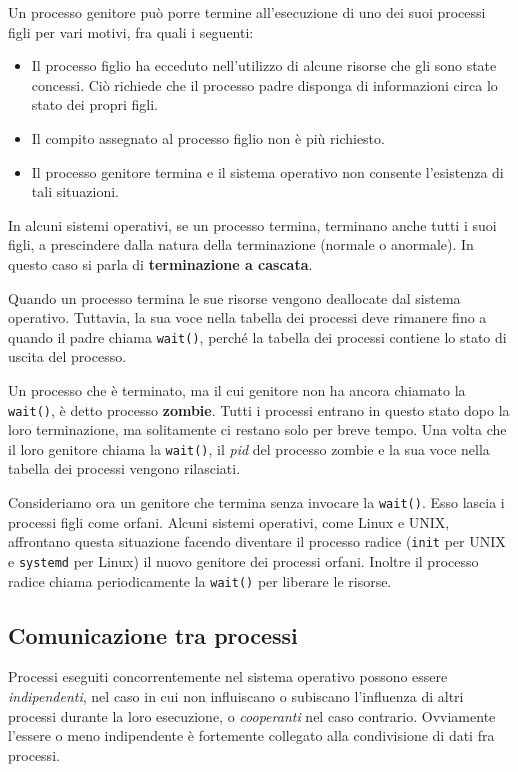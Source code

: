         Un processo genitore può porre termine all'esecuzione di uno dei suoi processi figli per vari motivi, fra quali i seguenti:
        \begin{itemize}
            \item Il processo figlio ha ecceduto nell'utilizzo di alcune risorse che gli sono state concessi. Ciò richiede che il processo padre disponga di informazioni circa lo stato dei propri figli.
            \item Il compito assegnato al processo figlio non è più richiesto.
            \item Il processo genitore termina e il sistema operativo non consente l'esistenza di tali situazioni.
        \end{itemize}
        
        In alcuni sistemi operativi, se un processo termina, terminano anche tutti i suoi figli, a prescindere dalla natura della terminazione (normale o anormale). In questo caso si parla di \textbf{terminazione a cascata}.
        
        Quando un processo termina le sue risorse vengono deallocate dal sistema operativo. Tuttavia, la sua voce nella tabella dei processi deve rimanere fino a quando il padre chiama \texttt{wait()}, perché la tabella dei processi contiene lo stato di uscita del processo.
        
        Un processo che è terminato, ma il cui genitore non ha ancora chiamato la \texttt{wait()}, è detto processo \textbf{zombie}. Tutti i processi entrano in questo stato dopo la loro terminazione, ma solitamente ci restano solo per breve tempo. Una volta che il loro genitore chiama la \texttt{wait()}, il \textit{pid} del processo zombie e la sua voce nella tabella dei processi vengono rilasciati.
        
        Consideriamo ora un genitore che termina senza invocare la \texttt{wait()}. Esso lascia i processi figli come orfani. Alcuni sistemi operativi, come Linux e UNIX, affrontano questa situazione facendo diventare il processo radice (\texttt{init} per UNIX e \texttt{systemd} per Linux) il nuovo genitore dei processi orfani. Inoltre il processo radice chiama periodicamente la \texttt{wait()} per liberare le risorse.
        
    \subsection{Comunicazione tra processi}
        Processi eseguiti concorrentemente nel sistema operativo possono essere \textit{indipendenti}, nel caso in cui non influiscano o subiscano l'influenza di altri processi durante la loro esecuzione, o \textit{cooperanti} nel caso contrario. Ovviamente l'essere o meno indipendente è fortemente collegato alla condivisione di dati fra processi.
        
